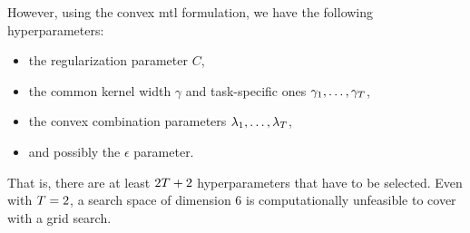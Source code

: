 However, using the convex \acrshort{mtl} formulation, 
we have the following hyperparameters: 
\begin{itemize}
    \item the regularization parameter $C$,
    \item the common kernel width $\gamma$ and task-specific ones $\gamma_1, \ldots, \gamma_T$,
    \item the convex combination parameters $\lambda_1, \ldots, \lambda_T$,
    \item and possibly the $\epsilon$ parameter.
\end{itemize}
That is, there are at least $2T + 2$ hyperparameters that have to be selected. Even with $T=2$, a search space of dimension $6$ is computationally unfeasible to cover with a grid search.

